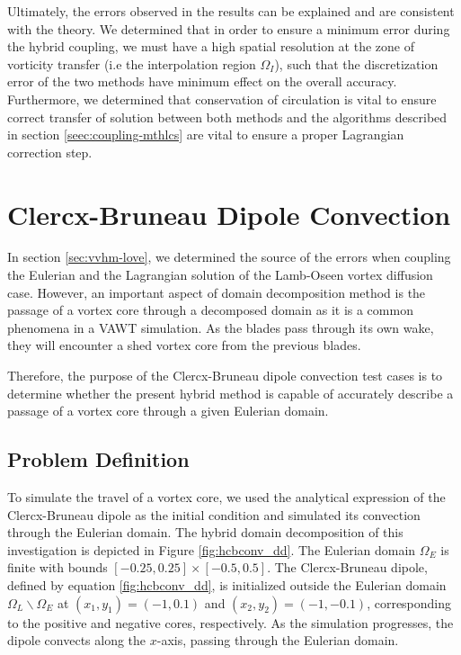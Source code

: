 Ultimately, the errors observed in the results can be explained and are consistent with the theory. We determined that in order to ensure a minimum error during the hybrid coupling, we must have a high spatial resolution at the zone of vorticity transfer (i.e the interpolation region $\Omega_I$), such that the discretization error of the two methods have minimum effect on the overall accuracy. Furthermore, we determined that conservation of circulation is vital to ensure correct transfer of solution between both methods and the algorithms described in section \ref{seec:coupling-mthlcs} are vital to ensure a proper Lagrangian correction step. 

\section{Clercx-Bruneau Dipole Convection}
\label{sec:vvhm-cbdc}

In section \ref{sec:vvhm-love}, we determined the source of the errors when coupling the Eulerian and the Lagrangian solution of the Lamb-Oseen vortex diffusion case. However, an important aspect of domain decomposition method is the passage of a vortex core through a decomposed domain as it is a common phenomena in a VAWT simulation. As the blades pass through its own wake, they will encounter a shed vortex core from the previous blades. 

Therefore, the purpose of the Clercx-Bruneau dipole convection test cases is to determine whether the present hybrid method is capable of accurately describe a passage of a vortex core through a given Eulerian domain.

\subsection{Problem Definition}

To simulate the travel of a vortex core, we used the analytical expression of the Clercx-Bruneau dipole \cite{Clercx2006a} as the initial condition and simulated its convection through the Eulerian domain. The hybrid domain decomposition of this investigation is depicted in Figure \ref{fig:hcbconv_dd}. The Eulerian domain $\Omega_E$ is finite with bounds $[-0.25,0.25]\times[-0.5,0.5]$. The Clercx-Bruneau dipole, defined by equation \ref{fig:hcbconv_dd}, is initialized outside the Eulerian domain $\Omega_L\backslash\Omega_E$ at $(x_1,y_1) = (-1,0.1)$ and $(x_2,y_2)=(-1,-0.1)$, corresponding to the positive and negative cores, respectively. As the simulation progresses, the dipole convects along the $x$-axis, passing through the Eulerian domain.

